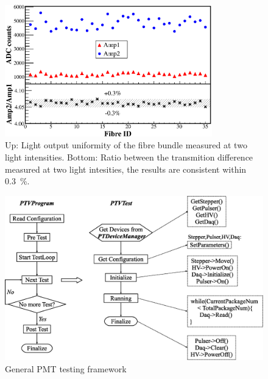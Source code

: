 \documentclass[5p, times]{elsarticle}
\begin{document}


\begin{figure}
 \centering
 \includegraphics[width=90mm]{fibre_diff}
\caption{
Up: Light output uniformity of the fibre bundle measured at two light intensities.
Bottom: Ratio between the transmition difference measured at two light intesities, the results are consistent within \textpm\SI{0.3}{\percent}.}
\label{fig:fibre_diff}
\end{figure} 

\begin{figure}
  \centering
 \includegraphics[width=130mm]{software_framework}
\caption{General PMT testing framework}
\label{fig:software_framework}
\end{figure}
\end{document}
